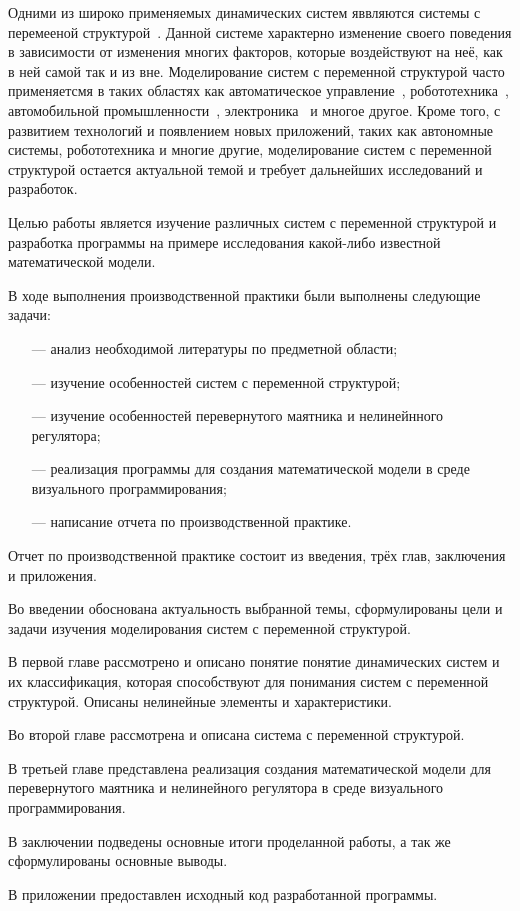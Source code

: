 \intro
 Одними из широко применяемых динамических систем яввляются системы с перемееной структурой~\cite{578556}. Данной системе характерно изменение своего поведения в зависимости от изменения многих факторов, которые воздействуют на неё, как в ней самой так и из вне. Моделирование систем с переменной структурой часто применяетсмя в таких областях как автоматическое управление~\cite{5498611}, робототехника~\cite{1}, автомобильной промышленности~\cite{2}, электроника~\cite{3}  и многое другое. Кроме того, с развитием технологий и появлением новых приложений, таких как автономные системы, робототехника и многие другие, моделирование систем с переменной структурой остается актуальной темой и требует дальнейших исследований и разработок.

 Целью работы является изучение различных систем с переменной структурой и разработка программы  на примере исследования какой-либо известной математической модели.

 В ходе выполнения производственной практики были выполнены следующие задачи:
\begin{enumerate}
\item[—] анализ необходимой литературы по предметной области;
\item[—] изучение особенностей систем с переменной структурой;
\item[—] изучение особенностей перевернутого маятника и нелинейнного регулятора;
\item[—] реализация программы для создания математической модели в среде визуального программирования;
\item[—] написание отчета по производственной практике.
\end{enumerate}

Отчет по производственной практике состоит из введения, трёх глав, заключения
и приложения.

Во введении обоснована актуальность выбранной темы, сформулированы цели и задачи изучения моделирования систем с переменной структурой.

В первой главе рассмотрено и описано понятие понятие динамических систем и их классификация, которая способствуют для понимания систем с переменной структурой. Описаны нелинейные элементы и характеристики.

Во второй главе рассмотрена и описана система с переменной структурой.

В третьей главе представлена реализация создания математической модели для перевернутого маятника и нелинейного регулятора в среде визуального программирования.

В заключении подведены основные итоги проделанной работы, а так же
сформулированы основные выводы.

В приложении предоставлен исходный код разработанной программы.

